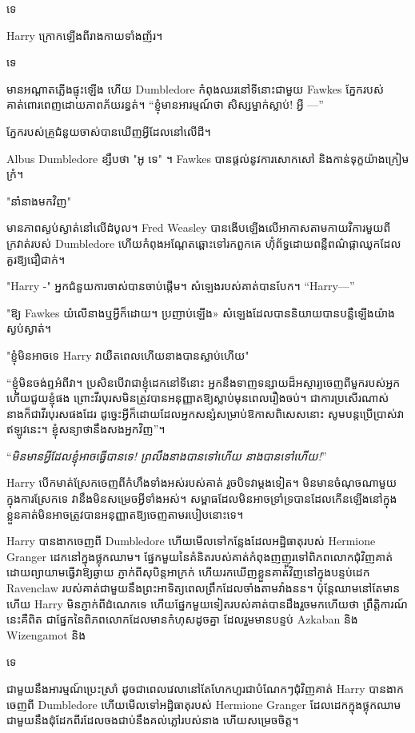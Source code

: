 ទេ

Harry ក្រោក​ឡើង​ពី​រាងកាយ​ទាំង​ញ័រ។

ទេ

មានអណ្តាតភ្លើងផ្ទុះឡើង ហើយ Dumbledore កំពុងឈរនៅទីនោះជាមួយ Fawkes ភ្នែករបស់គាត់ពោរពេញដោយភាពភ័យរន្ធត់។ “ខ្ញុំមានអារម្មណ៍ថា សិស្សម្នាក់ស្លាប់! អ្វី —”

ភ្នែក​របស់​គ្រូ​ជំនួយ​ចាស់​បាន​ឃើញ​អ្វី​ដែល​នៅ​លើ​ដី។

Albus Dumbledore ខ្សឹបថា "អូ ទេ" ។ Fawkes បានផ្តល់នូវការសោកសៅ និងកាន់ទុក្ខយ៉ាងក្រៀមក្រំ។

"នាំនាងមកវិញ"

មានភាពស្ងប់ស្ងាត់នៅលើដំបូល។ Fred Weasley បានងើបឡើងលើអាកាសតាមកាយវិការមួយពីក្រវាត់របស់ Dumbledore ហើយកំពុងអណ្តែតឆ្ពោះទៅរកពួកគេ ហ៊ុំព័ទ្ធដោយពន្លឺពណ៌ផ្កាឈូកដែលគួរឱ្យជឿជាក់។

"Harry -" អ្នកជំនួយការចាស់បានចាប់ផ្តើម។ សំឡេង​របស់​គាត់​បាន​បែក។ “Harry—”

"ឱ្យ Fawkes យំលើនាងឬអ្វីក៏ដោយ។ ប្រញាប់ឡើង» សំឡេង​ដែល​បាន​និយាយ​បាន​បន្លឺ​ឡើង​យ៉ាង​ស្ងប់ស្ងាត់។

"ខ្ញុំមិនអាចទេ Harry វាយឺតពេលហើយនាងបានស្លាប់ហើយ"

“ខ្ញុំ​មិន​ចង់​ឮ​អំពី​វា​។ ប្រសិនបើវាជាខ្ញុំដេកនៅទីនោះ អ្នកនឹងទាញទន្សាយដ៏អស្ចារ្យចេញពីមួករបស់អ្នក ហើយជួយខ្ញុំផង ព្រោះវីរបុរសមិនត្រូវបានអនុញ្ញាតឱ្យស្លាប់មុនពេលរឿងចប់។ ជាការប្រសើរណាស់ នាងក៏ជាវីរបុរសផងដែរ ដូច្នេះអ្វីក៏ដោយដែលអ្នកសន្សំសម្រាប់ឱកាសពិសេសនោះ សូមបន្តប្រើប្រាស់វាឥឡូវនេះ។ ខ្ញុំសន្យាថានឹងសងអ្នកវិញ”។

“\emph{មិនមានអ្វីដែលខ្ញុំអាចធ្វើបានទេ! ព្រលឹង​នាង​បាន​ទៅ​ហើយ នាង​បាន​ទៅ​ហើយ!}”

Harry បើក​មាត់​ស្រែក​ចេញ​ពី​កំហឹង​ទាំង​អស់​របស់​គាត់ រួច​បិទ​វា​ម្ដង​ទៀត។ មិនមានចំណុចណាមួយក្នុងការស្រែកទេ វានឹងមិនសម្រេចអ្វីទាំងអស់។ សម្ពាធដែលមិនអាចទ្រាំទ្របានដែលកើនឡើងនៅក្នុងខ្លួនគាត់មិនអាចត្រូវបានអនុញ្ញាតឱ្យចេញតាមរបៀបនោះទេ។

Harry បានងាកចេញពី Dumbledore ហើយមើលទៅកន្លែងដែលអដ្ឋិធាតុរបស់ Hermione Granger ដេកនៅក្នុងថ្លុកឈាម។ ផ្នែកមួយនៃគំនិតរបស់គាត់កំពុងញញួរទៅពិភពលោកជុំវិញគាត់ ដោយព្យាយាមធ្វើវាឱ្យឆ្ងាយ ភ្ញាក់ពីសុបិន្តអាក្រក់ ហើយរកឃើញខ្លួនគាត់វិញនៅក្នុងបន្ទប់ដេក Ravenclaw របស់គាត់ជាមួយនឹងព្រះអាទិត្យពេលព្រឹកដែលចាំងតាមវាំងនន។ ប៉ុន្តែឈាមនៅតែមាន ហើយ Harry មិនភ្ញាក់ពីដំណេកទេ ហើយផ្នែកមួយទៀតរបស់គាត់បានដឹងរួចមកហើយថា ព្រឹត្តិការណ៍នេះគឺពិត ជាផ្នែកនៃពិភពលោកដែលមានកំហុសដូចគ្នា ដែលរួមមានបន្ទប់ Azkaban និង Wizengamot និង

ទេ

ជាមួយនឹងអារម្មណ៍ប្រេះស្រាំ ដូចជាពេលវេលានៅតែហែកហួរជាបំណែកៗជុំវិញគាត់ Harry បានងាកចេញពី Dumbledore ហើយមើលទៅអដ្ឋិធាតុរបស់ Hermione Granger ដែលដេកក្នុងថ្លុកឈាម ជាមួយនឹងដុំដែកពីរដែលចងជាប់នឹងគល់ភ្លៅរបស់នាង ហើយសម្រេចចិត្ត។

